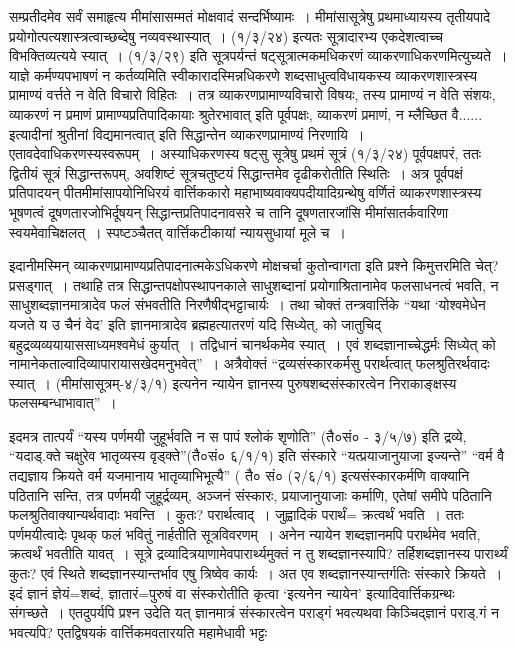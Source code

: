 {सम्प्रतीदमेव सर्वं समाहृत्य मीमांसासम्मतं मोक्षवादं सन्दर्भिष्यामः~। मीमांसासूत्रेषु प्रथमाध्यायस्य तृतीयपादे प्रयोगोत्पत्यशास्त्रत्वाच्छब्देषु नव्यवस्थास्यात्~। (१/३/२४) इत्यतः सूत्रादारभ्य एकदेशत्वाच्च विभक्तिव्यत्यये स्यात्~। (१/३/२९) इति सूत्रपर्यन्तं षट्सूत्रात्मकमधिकरणं व्याकरणाधिकरणमित्युच्यते~।  याज्ञे कर्मण्यपभाषणं न कर्तव्यमिति स्वीकारादस्मिन्नधिकरणे शब्दसाधुत्वविधायकस्य व्याकरणशास्त्रस्य प्रामाण्यं वर्त्तते न वेति विचारो विहितः~। तत्र व्याकरणप्रामाण्यविचारो विषयः, तस्य प्रामाण्यं न वेति संशयः, व्याकरणं न प्रमाणं प्रामाण्यप्रतिपादिकायाः श्रुतेरभावात् इति पूर्वपक्षः, व्याकरणं प्रमाणं, न म्लैच्छित वै...... इत्यादीनां श्रुतीनां विद्यमानत्वात् इति सिद्धान्तेन व्याकरणप्रामाण्यं निरणायि~। एतावदेवाधिकरणस्यस्वरूपम्~। अस्याधिकरणस्य षट्सु सूत्रेषु प्रथमं सूत्रं (१/३/२४) पूर्वपक्षपरं, ततः द्वितीयं सूत्रं सिद्धान्तरूपम्, अवशिष्टं सूत्रचतुष्टयं सिद्धान्तमेव दृढीकरोतीति स्थितिः~। अत्र पूर्वपक्षं प्रतिपादयन् पीतमीमांसापयोनिधिरयं वार्त्तिककारो महाभाष्यवाक्यपदीयादिग्रन्थेषु वर्णितं व्याकरणशास्त्रस्य भूषणत्वं दूषणतारजोभिर्दूषयन् सिद्धान्तप्रतिपादनावसरे च तानि दूषणतारजांसि मीमांसातर्कवारिणा स्वयमेवाचिक्षलत्~। स्पष्टञ्चैतत् वार्त्तिकटीकायां न्यायसुधायां मूले च~। 

इदानीमस्मिन् व्याकरणप्रामाण्यप्रतिपादनात्मकेऽधिकरणे मोक्षचर्चा कुतोन्वागता इति प्रश्ने किमुत्तरमिति चेत्? प्रसड्गात्~। तथाहि तत्र सिद्धान्तपक्षोपस्थापनकाले साधुशब्दानां प्रयोगाश्रितानामेव फलसाधनत्वं भवति, न साधुशब्दज्ञानमात्रादेव फलं संभवतीति निरणैषीद्भट्टाचार्यः~। तथा चोक्तं तन्त्रवार्त्तिके “यथा ‘योश्वमेधेन यजते य उ चैनं वेद’ इति ज्ञानमात्रादेव ब्रह्महत्यातरणं यदि सिध्येत्, को जातुचिद् बहुद्रव्यव्ययायाससाध्यमश्वमेधं कुर्यात्~। तद्विधानं चानर्थकमेव स्यात्~। एवं शब्दज्ञानाच्चेद्धर्मः सिध्येत् को नामानेकताल्वादिव्यापारायासखेदमनुभवेत्”~। अत्रैवोक्तं “द्रव्यसंस्कारकर्मसु परार्थत्वात् फलश्रुतिरर्थवादः स्यात्~। (मीमांसासूत्रम्-४/३/१) इत्यनेन न्यायेन ज्ञानस्य पुरुषशब्दसंस्कारत्वेन निराकाङ्क्षस्य फलसम्बन्धाभावात्”~। 

इदमत्र तात्पर्यं  “यस्य पर्णमयी जुहूर्भवति न स पापं श्लोकं शृणोति” (तै०सं० - ३/५/७) इति द्रव्ये, “यदाड्.क्ते चक्षुरेव भातृव्यस्य वृड्क्ते”(तै०सं० ६/­१/१) इति संस्कारे “यत्प्रयाजानुयाजा इज्यन्ते” “वर्म वै तद्यज्ञाय क्रियते वर्म यजमानाय भातृव्याभिभूत्यै” ( तै० सं० (२/६/१) इत्यसंस्कारकर्मणि वाक्यानि पठितानि सन्ति, तत्र पर्णमयी जुहूर्द्रव्यम्, अञ्जनं संस्कारः, प्रयाजानुयाजाः कर्माणि, एतेषां समीपे पठितानि फलश्रुतिवाक्यान्यर्थवादाः भवन्ति~। कुतः? परार्थत्वाद्~। जुह्वादिकं परार्थं= क्रत्वर्थं भवति~। ततः पर्णमयीत्वादेः पृथक् फलं भवितुं नार्हतीति सूत्रविवरणम्~। अनेन न्यायेन शब्दज्ञानमपि परार्थमेव भवति, क्रत्वर्थं भवतीति यावत्~। सूत्रे द्रव्यादित्रयाणामेवपारार्थ्यमुक्तं न तु शब्दज्ञानस्यापि? तर्हिशब्दज्ञानस्य पारार्थ्यं कुतः? एवं स्थिते शब्दज्ञानस्यान्तर्भाव एषु त्रिष्वेव कार्यः~। अत एव शब्दज्ञानस्यान्तर्गतिः संस्कारे क्रियते~। इदं ज्ञानं ज्ञेयं=शब्दं, ज्ञातारं=पुरुषं वा संस्करोतीति कृत्वा ‘इत्यनेन न्यायेन’ इत्यादिवार्त्तिकग्रन्थः संगच्छते~। एतदुपर्यपि प्रश्न उदेति यत् ज्ञानमात्रं संस्कारत्वेन पराड्गं भवत्यथवा किञ्चिद्ज्ञानं पराड्.गं न भवत्यपि? एतद्विषयकं वार्त्तिकमवतारयति महामेधावी भट्टः 

}
